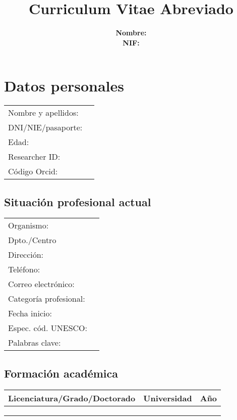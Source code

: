 \documentclass[a4paper]{article}
\title{Curriculum Vitae Abreviado}
\author{
  \begin{tabular}{ll}
    \textbf{Nombre:} &  \\
    \textbf{NIF:} & 
  \end{tabular}
}
\begin{document}
\def\normalfont{\sffamily}
\sffamily
\maketitle

\section{Datos personales}

\begin{tabular}{ll}
  Nombre y apellidos: &   \\
  DNI/NIE/pasaporte: &  \\
  Edad: &  \\
  Researcher ID: &  \\
  Código Orcid: & 
\end{tabular}

\subsection{Situación profesional actual}

\begin{tabular}{ll}
  Organismo: &  \\
  Dpto./Centro &  \\
  Dirección: &  \\
  Teléfono: &  \\
  Correo electrónico: &  \\
  Categoría profesional: &  \\
  Fecha inicio: &  \\
  Espec. cód. UNESCO: &  \\
  Palabras clave: & 
\end{tabular}

\subsection{Formación académica}

\begin{tabular}{lll}
  Licenciatura/Grado/Doctorado & Universidad & Año \\
  \hline
   &  &  \\
   &  &  \\
   &  & 
\end{tabular}
\end{document}
